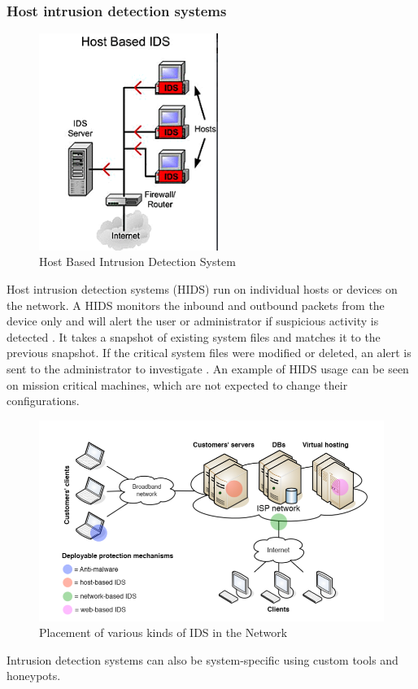 \documentclass[12pt]{article}
\theoremstyle{definition}
\begin{document}
			\subsubsection{Host intrusion detection systems}
			\begin{figure}[!h]
				\centering
				\includegraphics[height=200pt]{pictures/host-ids.png}
				\caption{Host Based Intrusion Detection System}
				\label{fig:host-ids}
			\end{figure}
			Host intrusion detection systems (HIDS) run on individual hosts or devices on the network. A HIDS monitors the inbound and outbound packets from the device only and will alert the user or administrator if suspicious activity is detected \cite{SumaiyaThaseen2016}. It takes a snapshot of existing system files and matches it to the previous snapshot. If the critical system files were modified or deleted, an alert is sent to the administrator to investigate \cite{Vijai2016}. An example of HIDS usage can be seen on mission critical machines, which are not expected to change their configurations.
			\begin{figure}
				\centering
				\includegraphics[width=400pt]{pictures/applications-of-ids.png}
				\caption{Placement of various kinds of IDS in the Network}
				\label{fig:mlp-net}
			\end{figure}
			Intrusion detection systems can also be system-specific using custom tools and honeypots.	
			
\end{document}
